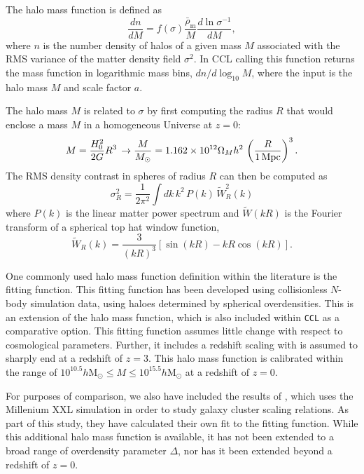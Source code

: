 \documentclass[\docopts]{\docclass}
\newcommand{\ccl}{{\tt CCL}\xspace}
\begin{document}
The halo mass function is defined as
\begin{equation}
\frac{dn}{dM}=f(\sigma)\frac{\bar{\rho}_\mathrm{m}}{M}\frac{d\ln{\sigma^{-1}}}{dM},
\end{equation}
where $n$ is the number density of halos of a given mass $M$ associated with the RMS variance of the matter density field $\sigma^2$.
In CCL calling this function returns the mass function in logarithmic mass bins, $dn/d\log_{10}{M}$, where the input is the halo mass $M$ and scale factor $a$.

The halo mass $M$ is related to $\sigma$ by first computing the radius $R$ that would enclose a mass $M$ in a homogeneous Universe at $z=0$:
\begin{equation}
  M=\frac{H_0^2}{2G}R^3\,\rightarrow \frac{M}{M_\odot}=1.162\times10^{12}\Omega_Mh^2\,\left(\frac{R}{1\,{\rm Mpc}}\right)^3.
\end{equation}
The RMS density contrast in spheres of radius $R$ can then be computed as
\begin{equation}
  \sigma_R^2 = \frac{1}{2\pi^2}\int dk\,k^2\,P(k)\,\tilde{W}_R^2(k)
  \label{eq:sigR}
\end{equation}
where $P(k)$ is the linear matter power spectrum and $\tilde{W}(kR)$ is the Fourier transform of a spherical top hat window function,
\begin{equation}
\tilde{W}_R(k) = \frac{3}{(kR)^3}[\sin(kR)-kR\cos(kR)].
\end{equation}

One commonly used halo mass function definition within the literature is the \citet{Tinker2010} fitting function. This fitting function has been developed using collisionless $N$-body simulation data, using haloes determined by spherical overdensities. This is an extension of the \citet{Tinker2008} halo mass function, which is also included within \ccl as a comparative option. This fitting function assumes little change with respect to cosmological parameters. Further, it includes a redshift scaling with is assumed to sharply end at a redshift of $z = 3$. This halo mass function is calibrated within the range of $10^{10.5} h\mathrm{M}_\odot \leq M \leq 10^{15.5} h\mathrm{M}_\odot$ at a redshift of $z = 0$.

For purposes of comparison, we also have included the results of \citet{Angulo2012}, which uses the Millenium XXL simulation in order to study galaxy cluster scaling relations. As part of this study, they have calculated their own fit to the \citet{Tinker2010} fitting function. While this additional halo mass function is available, it has not been extended to a broad range of overdensity parameter $\Delta$, nor has it been extended beyond a redshift of $z = 0$.
\end{document}
